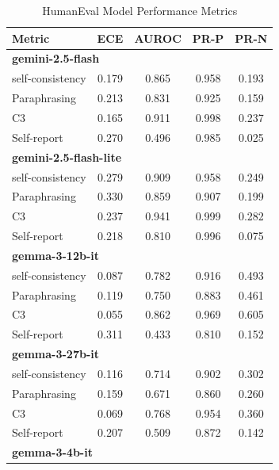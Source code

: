 \documentclass[11pt]{article}
\theoremstyle{plain}
\theoremstyle{definition}
\theoremstyle{remark}
\begin{document}
\begin{table}[p]
\centering
\caption{HumanEval Model Performance Metrics}
\label{tab:humaneval-metrics}
\scriptsize
\begin{minipage}[t]{0.48\textwidth}
    \centering
    \begin{tabular}{lcccc}
        \toprule
        \textbf{Metric} & \textbf{ECE} & \textbf{AUROC} & \textbf{PR-P} & \textbf{PR-N} \\
        \midrule
        \multicolumn{5}{l}{\textbf{gemini-2.5-flash}} \\
        self-consistency & 0.179 & 0.865 & 0.958 & 0.193 \\
        Paraphrasing     & 0.213 & 0.831 & 0.925 & 0.159 \\
       C3             & 0.165 & 0.911 & 0.998 & 0.237 \\
        Self-report      & 0.270 & 0.496 & 0.985 & 0.025 \\
        \midrule
        \multicolumn{5}{l}{\textbf{gemini-2.5-flash-lite}} \\
        self-consistency & 0.279 & 0.909 & 0.958 & 0.249 \\
        Paraphrasing     & 0.330 & 0.859 & 0.907 & 0.199 \\
       C3             & 0.237 & 0.941 & 0.999 & 0.282 \\
        Self-report      & 0.218 & 0.810 & 0.996 & 0.075 \\
        \midrule
        \multicolumn{5}{l}{\textbf{gemma-3-12b-it}} \\
        self-consistency & 0.087 & 0.782 & 0.916 & 0.493 \\
        Paraphrasing     & 0.119 & 0.750 & 0.883 & 0.461 \\
       C3             & 0.055 & 0.862 & 0.969 & 0.605 \\
        Self-report      & 0.311 & 0.433 & 0.810 & 0.152 \\
        \midrule
        \multicolumn{5}{l}{\textbf{gemma-3-27b-it}} \\
        self-consistency & 0.116 & 0.714 & 0.902 & 0.302 \\
        Paraphrasing     & 0.159 & 0.671 & 0.860 & 0.260 \\
       C3             & 0.069 & 0.768 & 0.954 & 0.360 \\
        Self-report      & 0.207 & 0.509 & 0.872 & 0.142 \\
        \midrule
        \multicolumn{5}{l}{\textbf{gemma-3-4b-it}} \\

\end{tabular}
\end{minipage}
\end{table}
\end{document}
